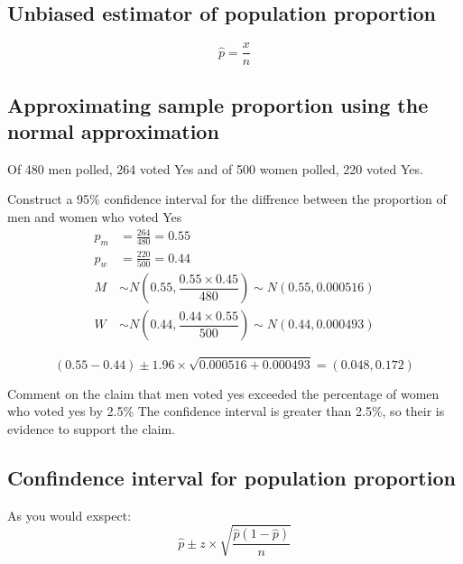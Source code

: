         \subsection{Unbiased estimator of population proportion}
            $$\hat{p} = \frac{x}{n}$$

        \subsection{Approximating sample proportion using the normal approximation}
            \begin{example}
            {
                Of 480 men polled, 264 voted Yes and of 500 women polled, 220 voted Yes.
            }

                \begin{step}{Construct a 95\% confidence interval for the diffrence between the proportion of men and women who voted Yes}
                    \begin{align*}
                        \hat{p}_m &= \frac{264}{480} = 0.55                                     \\
                        \hat{p}_w &= \frac{220}{500} = 0.44                                     \\
                        M &\sim N(0.55, \dfrac{0.55 \times 0.45}{480}) \sim N(0.55, 0.000516)   \\
                        W &\sim N(0.44, \dfrac{0.44 \times 0.55}{500}) \sim N(0.44, 0.000493)
                    \end{align*}

                    $$(0.55 - 0.44) \pm 1.96 \times \sqrt{0.000516 + 0.000493} = (0.048, 0.172)$$
                \end{step}

                \begin{step}{Comment on the claim that men voted yes exceeded the percentage of women who voted yes by 2.5\%}
                    The confidence interval is greater than 2.5\%, so their is evidence to support the claim.
                \end{step}
            \end{example}
        
        \subsection{Confindence interval for population proportion}
            As you would exspect:
            $$
            \hat{p} \pm z \times \sqrt{\frac{\hat{p}(1-\hat{p})}{n}}
            $$

